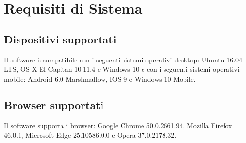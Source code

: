 \newpage
\section{Requisiti di Sistema}
\subsection{Dispositivi supportati}
Il software \progetto{} è compatibile con i seguenti sistemi operativi desktop: Ubuntu 16.04 LTS, OS X El Capitan 10.11.4 e Windows 10 e con i seguenti sistemi operativi mobile: Android 6.0 Marshmallow, IOS 9 e Windows 10 Mobile.
\subsection{Browser supportati}
Il software \progetto{} supporta i browser: Google Chrome 50.0.2661.94, Mozilla Firefox 46.0.1, Microsoft Edge 25.10586.0.0 e Opera 37.0.2178.32.